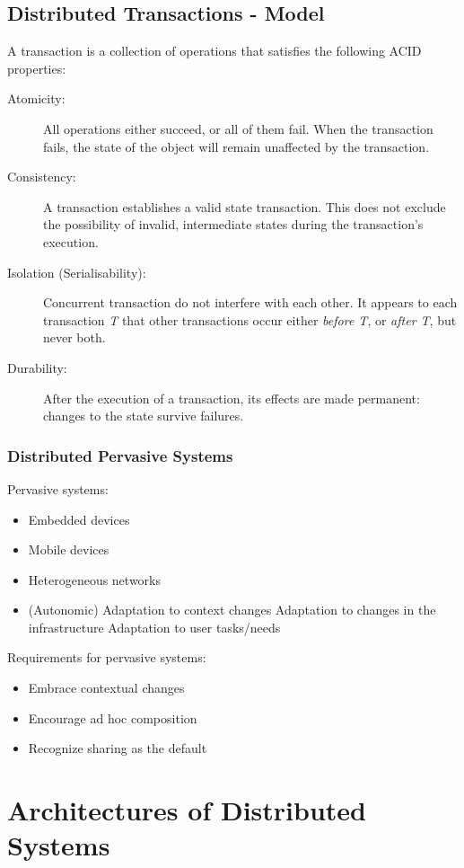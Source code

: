 \subsection{Distributed Transactions - Model}
	A transaction is a collection of operations that satisfies the following ACID properties:
	\begin{description}
		\item[Atomicity:] All operations either succeed, or all of them fail. When the transaction fails, the state of the object will remain unaffected by the transaction.
		\item[Consistency:] A transaction establishes a valid state transaction. This does not exclude the possibility of invalid, intermediate states during the transaction's execution.
		\item[Isolation (Serialisability):] Concurrent transaction do not interfere with each other. It appears to each transaction \textit{T} that other transactions occur either \textit{before T}, or \textit{after T}, but never both.
		\item[Durability:] After the execution of a transaction, its effects are made permanent: changes to the state survive failures.
	\end{description}

\subsubsection{Distributed Pervasive Systems}
Pervasive systems:
\begin{itemize}
	\item Embedded devices
	\item Mobile devices
	\item Heterogeneous networks
	\item (Autonomic) Adaptation to context changes
	\subitem Adaptation to changes in the infrastructure
	\subitem Adaptation to user tasks/needs
\end{itemize}
Requirements for pervasive systems:
\begin{itemize}
	\item Embrace contextual changes
	\item Encourage ad hoc composition
	\item Recognize sharing as the default
\end{itemize}

\section{Architectures of Distributed Systems}
